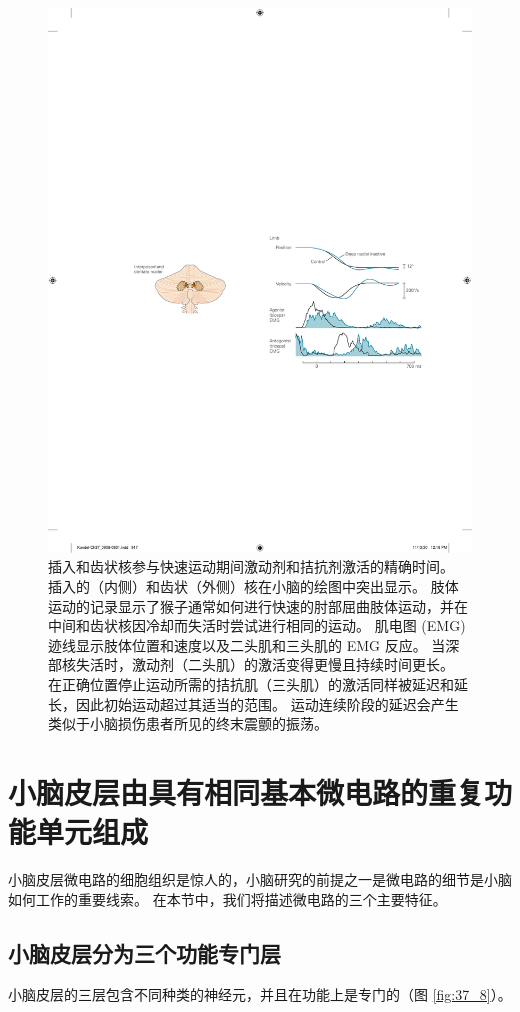 \begin{figure}[htbp]
	\centering
	\includegraphics[width=0.5\linewidth]{chap37/fig_37_7}
	\caption{插入和齿状核参与快速运动期间激动剂和拮抗剂激活的精确时间。 插入的（内侧）和齿状（外侧）核在小脑的绘图中突出显示。 肢体运动的记录显示了猴子通常如何进行快速的肘部屈曲肢体运动，并在中间和齿状核因冷却而失活时尝试进行相同的运动。 肌电图 (EMG) 迹线显示肢体位置和速度以及二头肌和三头肌的 EMG 反应。 当深部核失活时，激动剂（二头肌）的激活变得更慢且持续时间更长。 在正确位置停止运动所需的拮抗肌（三头肌）的激活同样被延迟和延长，因此初始运动超过其适当的范围。 运动连续阶段的延迟会产生类似于小脑损伤患者所见的终末震颤的振荡。}
	\label{fig:37_7}
\end{figure}


\section{小脑皮层由具有相同基本微电路的重复功能单元组成}

小脑皮层微电路的细胞组织是惊人的，小脑研究的前提之一是微电路的细节是小脑如何工作的重要线索。
在本节中，我们将描述微电路的三个主要特征。



\subsection{小脑皮层分为三个功能专门层}

小脑皮层的三层包含不同种类的神经元，并且在功能上是专门的（图 \ref{fig:37_8}）。


